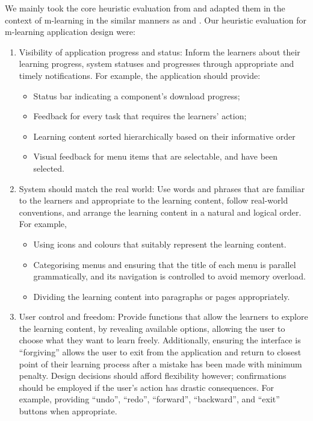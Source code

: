 We mainly took the core heuristic evaluation from \cite{nielsen199510} and adapted them in the context of m-learning in the similar manners as \cite{reeves2002usability} and \cite{yanez2014heuristic}. Our heuristic evaluation for m-learning application design were: 

\begin{enumerate}
\item Visibility of application progress and status: Inform the learners about their learning progress, system statuses and progresses through appropriate and timely notifications. For example, the application should provide:

\begin{itemize}
\item Status bar indicating a component's download progress;
\item Feedback for every task that requires the learners' action;
\item Learning content sorted hierarchically based on their informative order
\item Visual feedback for menu items that are selectable, and have been selected. 
\end{itemize}

\item System should match the real world: Use words and phrases that are familiar to the learners and appropriate to the learning content, follow real-world conventions, and arrange the learning content in a natural and logical order. For example, 
\begin{itemize}
\item Using icons and colours that suitably represent the learning content.
\item Categorising menus and ensuring that the title of each menu is parallel grammatically, and its navigation is controlled to avoid memory overload.
\item Dividing the learning content into paragraphs or pages appropriately. 
\end{itemize}

\item User control and freedom: Provide functions that allow the learners to explore the learning content, by revealing available options, allowing the user to choose what they want to learn freely. Additionally, ensuring the interface is ``forgiving'' allows the user to exit from the application and return to closest point of their learning process after a mistake has been made with minimum penalty. Design decisions should afford flexibility however; confirmations should be employed if the user's action has drastic consequences. For example, providing ``undo'', ``redo'', ``forward'', ``backward'', and ``exit'' buttons when appropriate. 


\end{enumerate}
